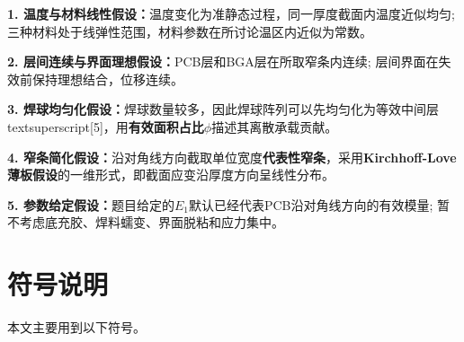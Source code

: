 \documentclass[draft,12pt,a4paper]{ctexart}
\theoremstyle{definition}
\begin{document}
\textbf{1. 温度与材料线性假设：}温度变化为准静态过程，同一厚度截面内温度近似均匀; 三种材料处于线弹性范围，材料参数在所讨论温区内近似为常数。

\textbf{2. 层间连续与界面理想假设：}PCB层和BGA层在所取窄条内连续; 层间界面在失效前保持理想结合，位移连续。

\textbf{3. 焊球均匀化假设：}焊球数量较多，因此焊球阵列可以先均匀化为等效中间层\\textsuperscript{[5]}，用\textbf{有效面积占比}$\phi$描述其离散承载贡献。

\textbf{4. 窄条简化假设：}沿对角线方向截取单位宽度\textbf{代表性窄条}，采用\textbf{Kirchhoff-Love薄板假设}的一维形式，即截面应变沿厚度方向呈线性分布。

\textbf{5. 参数给定假设：}题目给定的$E_1$默认已经代表PCB沿对角线方向的有效模量; 暂不考虑底充胶、焊料蠕变、界面脱粘和应力集中。

\section{符号说明}

本文主要用到以下符号。
\end{document}

